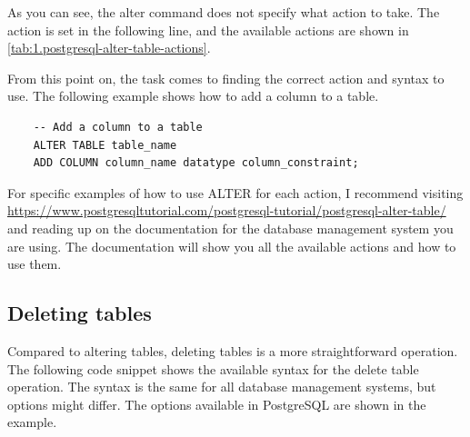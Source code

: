 As you can see, the alter command does not specify what action to take. The action is set in the following line, and the available actions are shown in \cref{tab:1.postgresql-alter-table-actions}.

\begin{table}[htb]
    \centering
    \caption{Available actions for the ALTER TABLE statement}
    \label{tab:1.postgresql-alter-table-actions}
\end{table}

From this point on, the task comes to finding the correct action and syntax to use. The following example shows how to add a column to a table.

\begin{verbatim}
    -- Add a column to a table
    ALTER TABLE table_name 
    ADD COLUMN column_name datatype column_constraint;
\end{verbatim}

For specific examples of how to use ALTER for each action, I recommend visiting \url{https://www.postgresqltutorial.com/postgresql-tutorial/postgresql-alter-table/} and reading up on the documentation for the database management system you are using. The documentation will show you all the available actions and how to use them.


\subsection{Deleting tables}
Compared to altering tables, deleting tables is a more straightforward operation. The following code snippet shows the available syntax for the delete table operation. The syntax is the same for all database management systems, but options might differ. The options available in PostgreSQL are shown in the example.

